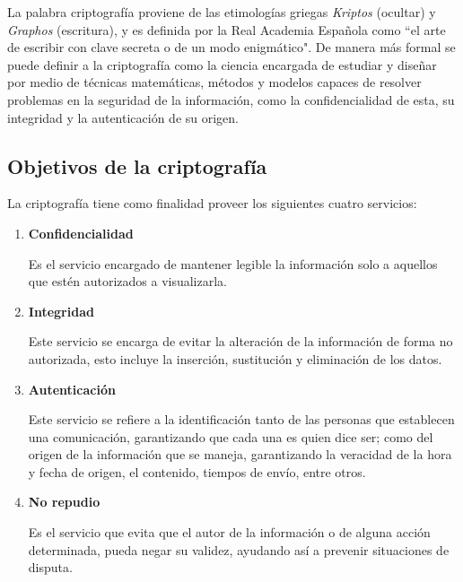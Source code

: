 
La palabra criptografía proviene de las etimologías griegas \textit{Kriptos}
(ocultar) y \textit{Graphos} (escritura), y es definida por la Real Academia
Española como ``el arte de escribir con clave secreta o de un modo enigmático".
De manera más formal se puede definir a la criptografía como la ciencia
encargada de estudiar y diseñar por medio de técnicas matemáticas, métodos y
modelos capaces de resolver problemas en la seguridad de la información, como
la confidencialidad de esta, su integridad y la autenticación de su origen.

  \subsection{Objetivos de la criptografía}

    La criptografía tiene como finalidad proveer los siguientes cuatro
    servicios:

    \begin{enumerate}

      \item \textbf{Confidencialidad}

        Es el servicio encargado de mantener legible la información solo a
        aquellos que estén autorizados a visualizarla.

      \item \textbf{Integridad}

        Este servicio se encarga de evitar la alteración de la información de
        forma no autorizada, esto incluye la inserción, sustitución y
        eliminación de los datos.

      \item \textbf{Autenticación}

        Este servicio se refiere a la identificación tanto de las personas que
        establecen una comunicación, garantizando que cada una es quien dice
        ser; como del origen de la información que se maneja, garantizando la
        veracidad de la hora y fecha de origen, el contenido, tiempos de
        envío, entre otros.

      \item \textbf{No repudio}

        Es el servicio que evita que el autor de la información o de alguna
        acción determinada, pueda negar su validez, ayudando así a prevenir
        situaciones de disputa.

    \end{enumerate}
